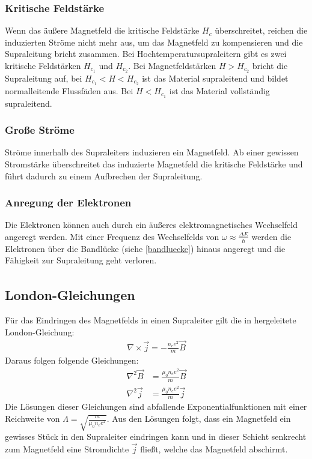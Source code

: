 \documentclass[12pt]{article}
\begin{document}
\subsubsection{Kritische Feldstärke}
Wenn das äußere Magnetfeld die kritische Feldstärke $H_c$ überschreitet, reichen die induzierten Ströme nicht mehr aus, um das Magnetfeld zu kompensieren und die Supraleitung bricht zusammen. Bei Hochtemperatursupraleitern gibt es zwei kritische Feldstärken $H_{c_1}$ und  $H_{c_2}$. Bei Magnetfeldstärken $H>H_{c_2}$ bricht die Supraleitung auf, bei $H_{c_1}<H<H_{c_2}$ ist das Material supraleitend und bildet normalleitende Flussfäden aus. Bei $H<H_{c_1}$ ist das Material vollständig supraleitend.
\subsubsection{Große Ströme}
Ströme innerhalb des Supraleiters induzieren ein Magnetfeld. Ab einer gewissen Stromstärke überschreitet das induzierte Magnetfeld die kritische Feldstärke und führt dadurch zu einem Aufbrechen der Supraleitung.
\subsubsection{Anregung der Elektronen}
Die Elektronen können auch durch ein äußeres elektromagnetisches Wechselfeld angeregt werden. Mit einer Frequenz des Wechselfelds von $\omega\approx\frac{\Delta E}{\hbar}$ werden die Elektronen über die Bandlücke (siehe \ref{bandluecke}) hinaus angeregt und die Fähigkeit zur Supraleitung geht verloren.

\subsection{London-Gleichungen\textsuperscript{\cite{anleitung}}}
\label{London}
Für das Eindringen des Magnetfelds in einen Supraleiter gilt die in \cite{anleitung} hergeleitete London-Gleichung:
\begin{align}
	\nabla\times\vec j=-\frac{n_ee^2}{m}\vec B
\end{align}
Daraus folgen folgende Gleichungen:
\begin{align*}
	\nabla^2\vec B&=\frac{\mu_0n_ee^2}{m}\vec{B}\\
	\nabla^2\vec j&=\frac{\mu_0n_ee^2}{m}\vec{j}
\end{align*}
Die Lösungen dieser Gleichungen sind abfallende Exponentialfunktionen mit einer Reichweite von $\Lambda=\sqrt{\frac m{\mu_0n_ee^2}}$. Aus den Lösungen folgt, dass ein Magnetfeld ein gewisses Stück in den Supraleiter eindringen kann und in dieser Schicht senkrecht zum Magnetfeld eine Stromdichte $\vec j$ fließt, welche das Magnetfeld abschirmt.
\end{document}

